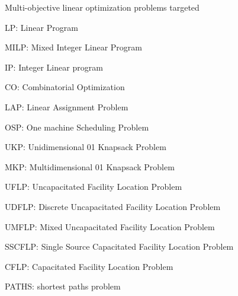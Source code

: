 \documentclass[10pt,xcolor=dvipsnames]{beamer}
\newcommand{\grey}{\textcolor{black!25}}
\begin{document}
%
% 
\begin{frame}{Multi-objective linear optimization problems targeted}

{\small
\begin{itemize}
\item LP: Linear Program
\item MILP: Mixed Integer Linear Program
\item IP: Integer Linear program
\item CO: Combinatorial Optimization
\item LAP: Linear Assignment Problem
\item OSP: One machine Scheduling Problem
\grey{
\item UKP: Unidimensional 01 Knapsack Problem
\item MKP: Multidimensional 01 Knapsack Problem
\item UFLP: Uncapacitated Facility Location Problem
\item UDFLP: Discrete Uncapacitated Facility Location Problem
\item UMFLP: Mixed Uncapacitated Facility Location Problem
\item SSCFLP: Single Source Capacitated Facility Location Problem
\item CFLP: Capacitated Facility Location Problem
\item PATHS: shortest paths problem
}
\end{itemize}
}
\end{frame}
\end{document}
